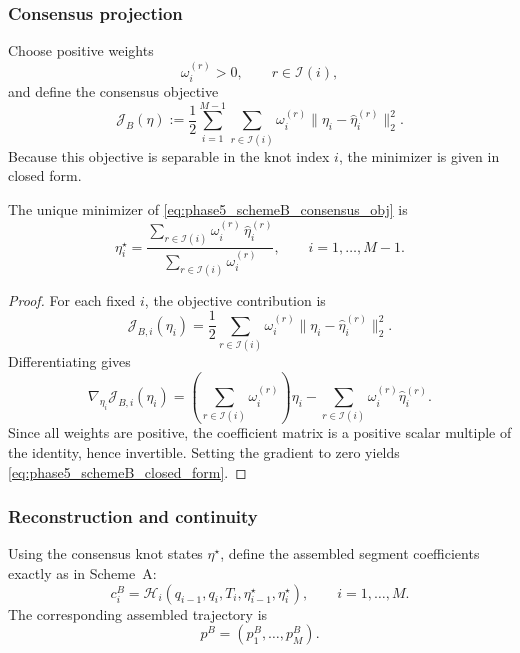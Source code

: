 \subsubsection{Consensus projection}
\label{subsubsec:phase5_schemeB_consensus}

Choose positive weights
\[
\omega_i^{(r)}>0,\qquad r\in\mathcal I(i),
\]
and define the consensus objective
\begin{equation}
\label{eq:phase5_schemeB_consensus_obj}
\mathcal J_B(\eta)
:=
\frac12\sum_{i=1}^{M-1}\sum_{r\in\mathcal I(i)}
\omega_i^{(r)}
\bigl\|\eta_i-\widehat\eta_i^{(r)}\bigr\|_2^2.
\end{equation}
Because this objective is separable in the knot index \(i\), the minimizer is given in closed form.

\begin{proposition}
\label{prop:phase5_schemeB_closed_form}
The unique minimizer of \eqref{eq:phase5_schemeB_consensus_obj} is
\begin{equation}
\label{eq:phase5_schemeB_closed_form}
\eta_i^\star
=
\frac{\sum_{r\in\mathcal I(i)} \omega_i^{(r)}\,\widehat\eta_i^{(r)}}
{\sum_{r\in\mathcal I(i)} \omega_i^{(r)}},
\qquad i=1,\dots,M-1.
\end{equation}
\end{proposition}

\begin{proof}
For each fixed \(i\), the objective contribution is
\[
\mathcal J_{B,i}(\eta_i)
=
\frac12\sum_{r\in\mathcal I(i)} \omega_i^{(r)}
\|\eta_i-\widehat\eta_i^{(r)}\|_2^2.
\]
Differentiating gives
\[
\nabla_{\eta_i}\mathcal J_{B,i}(\eta_i)
=
\left(\sum_{r\in\mathcal I(i)}\omega_i^{(r)}\right)\eta_i
-
\sum_{r\in\mathcal I(i)}\omega_i^{(r)}\widehat\eta_i^{(r)}.
\]
Since all weights are positive, the coefficient matrix is a positive scalar multiple of the identity, hence invertible.
Setting the gradient to zero yields \eqref{eq:phase5_schemeB_closed_form}.
\end{proof}

\subsubsection{Reconstruction and continuity}
\label{subsubsec:phase5_schemeB_reconstruction}

Using the consensus knot states \(\eta^\star\), define the assembled segment coefficients exactly as in Scheme~A:
\begin{equation}
\label{eq:phase5_schemeB_ci}
c_i^{B}
=
\mathcal H_i(q_{i-1},q_i,T_i,\eta_{i-1}^\star,\eta_i^\star),
\qquad i=1,\dots,M.
\end{equation}
The corresponding assembled trajectory is
\[
p^B=(p_1^B,\dots,p_M^B).
\]

